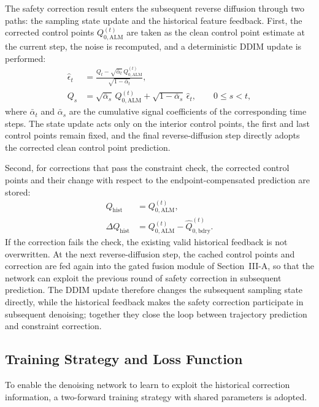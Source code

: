 \documentclass[journal]{IEEEtran}
\newcommand{\Qbdry}{\widehat{Q}_{0,\mathrm{bdry}}^{(t)}}
\newcommand{\Qalm}{Q_{0,\mathrm{ALM}}^{(t)}}
\newcommand{\abar}{\bar{\alpha}}
\begin{document}
The safety correction result enters the subsequent reverse diffusion through
two paths: the sampling state update and the historical feature feedback.
First, the corrected control points $\Qalm$ are taken as the clean control
point estimate at the current step, the noise is recomputed, and a
deterministic DDIM update is performed:
\begin{equation}
\begin{aligned}
\widehat{\epsilon}_t
&=\frac{Q_t-\sqrt{\abar_t}\,\Qalm}{\sqrt{1-\abar_t}},\\
Q_s&=\sqrt{\abar_s}\,\Qalm+\sqrt{1-\abar_s}\,\widehat{\epsilon}_t,
\qquad 0\leq s<t,
\end{aligned}
\end{equation}
where $\abar_t$ and $\abar_s$ are the cumulative signal coefficients of the
corresponding time steps. The state update acts only on the interior control
points, the first and last control points remain fixed, and the final
reverse-diffusion step directly adopts the corrected clean control point
prediction.

Second, for corrections that pass the constraint check, the corrected control
points and their change with respect to the endpoint-compensated prediction are
stored:
\begin{equation}
\begin{aligned}
Q_{\mathrm{hist}}&=\Qalm,\\
\Delta Q_{\mathrm{hist}}&=\Qalm-\Qbdry.
\end{aligned}
\end{equation}
If the correction fails the check, the existing valid historical feedback is
not overwritten. At the next reverse-diffusion step, the cached control points
and correction are fed again into the gated fusion module of
Section~III-A, so that the network can exploit the previous round of safety
correction in subsequent prediction. The DDIM update therefore changes the
subsequent sampling state directly, while the historical feedback makes the
safety correction participate in subsequent denoising; together they close the
loop between trajectory prediction and constraint correction.

\subsection{Training Strategy and Loss Function}

To enable the denoising network to learn to exploit the historical correction
information, a two-forward training strategy with shared parameters is adopted.
\end{document}
